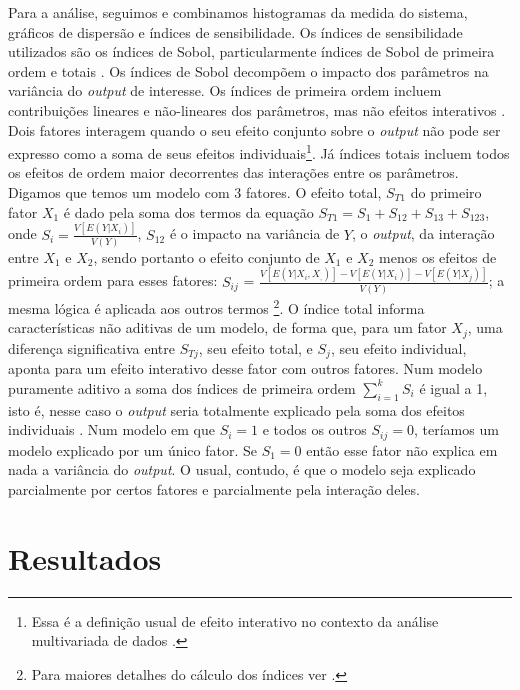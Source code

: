 Para a análise, seguimos  e combinamos
histogramas da medida do sistema, gráficos de dispersão e índices de
sensibilidade. Os índices de sensibilidade utilizados são os índices de Sobol,
particularmente índices de Sobol de primeira ordem e totais
\cite{saltelli2008global}. Os índices de Sobol decompõem o impacto dos
parâmetros na variância do \textit{output} de interesse. Os índices de primeira
ordem incluem contribuições lineares e não-lineares dos parâmetros, mas não
efeitos interativos \cite{ten2016sensitivity}. Dois fatores interagem quando o
seu efeito conjunto sobre o \textit{output} não pode ser expresso como a soma de
seus efeitos individuais\footnote{Essa é a definição usual de efeito interativo
  no contexto da análise multivariada de dados \cite{hair2009analise}.}. Já
índices totais incluem todos os efeitos de ordem maior decorrentes das
interações entre os parâmetros. Digamos que temos um modelo com 3 fatores. O
efeito total, \(S_{T1}\) do primeiro fator \(X_1\) é dado pela soma dos termos
da equação \(S_{T1} = S_1 + S_{12} + S_{13} + S_{123}\), onde \(S_i =
\frac{V[E(Y|X_i)]}{V(Y)}\), \(S_{12}\) é o impacto na variância de \(Y\), o
\textit{output}, da interação entre \(X_1\) e \(X_2\), sendo portanto o efeito
conjunto de \(X_1\) e \(X_2\) menos os efeitos de primeira ordem para esses
fatores: \(S_{ij}\) = \(\frac{V[E(Y|X_i,X_,)] - V[E(Y|X_i)] - V[E(Y|X_j)]}{V(Y)}
\); a mesma lógica é aplicada aos outros termos \footnote{ Para maiores detalhes
  do cálculo dos índices ver .}. O
índice total informa características não aditivas de um modelo, de forma que,
para um fator \(X_j\), uma diferença significativa entre \(S_{Tj}\), seu efeito
total, e \(S_j\), seu efeito individual, aponta para um efeito interativo desse
fator com outros fatores. Num modelo puramente aditivo a soma dos índices de
primeira ordem \(\sum_{i=1}^k S_i\) é igual a 1, isto é, nesse caso o
\textit{output} seria totalmente explicado pela soma dos efeitos individuais
\cite{saltelli2008global}. Num modelo em que \(S_i = 1\) e todos os outros
\(S_{ij} = 0\), teríamos um modelo explicado por um único fator. Se \(S_1 = 0\)
então esse fator não explica em nada a variância do \textit{output}. O usual,
contudo, é que o modelo seja explicado parcialmente por certos fatores e
parcialmente pela interação deles.

\section{Resultados}

